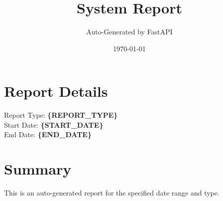 \documentclass{article}
\title{System Report}
\author{Auto-Generated by FastAPI}
\date{\today}
\begin{document}
\maketitle

\section*{Report Details}
Report Type: \textbf{\{REPORT_TYPE\}} \\
Start Date: \textbf{\{START_DATE\}} \\
End Date: \textbf{\{END_DATE\}}

\section*{Summary}
This is an auto-generated report for the specified date range and type.
\end{document}
